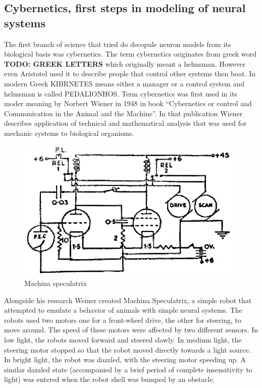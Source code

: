 \subsection{Cybernetics, first steps in modeling of neural systems}
The first branch of science that tried do decopule neuron models from its biological basis was 
cybernetics. The term cybernetics originates from greek word \textbf{TODO: GREEK LETTERS} which
originally meant a helmsman. However even Aristotel used it to describe people that control 
other systems then boat. In modern Greek KIBRNETES means either a manager or a control system and 
helmsman is called PEDALIONHOS.
Term cybernetics was first used in its moder meaning by Norbert Wiener in 1948 in book 
``Cybernetics or control and Communication in the Animal and the Machine''. 
In that publication Wiener describes application of technical and mathematical analysis 
that was used for mechanic systems to biological organisms.
\begin{figure}[ht]
	\includegraphics[width=\textwidth]{res/speculatrix}
	\caption{Machina speculatrix}
	\label{fig:machina_speculatrix}
\end{figure}
Alongside his research Weiner created Machina Speculatrix, a simple robot that attempted to
emulate a behavior of animals with simple neural systems.
The robots used two motors  one for a front-wheel drive, the other for steering, to move around.
The speed of these motors were affected by two different sensors. In low light, 
the robots moved forward and steered slowly. In medium light, the steering motor stopped so
that the robot moved directly towards a light source. 
In bright light, the robot was dazzled, with the steering motor speeding up. 
A similar dazzled state (accompanied by a brief period of complete insensitivity to light)
was entered when the robot shell was bumped by an obstacle.

